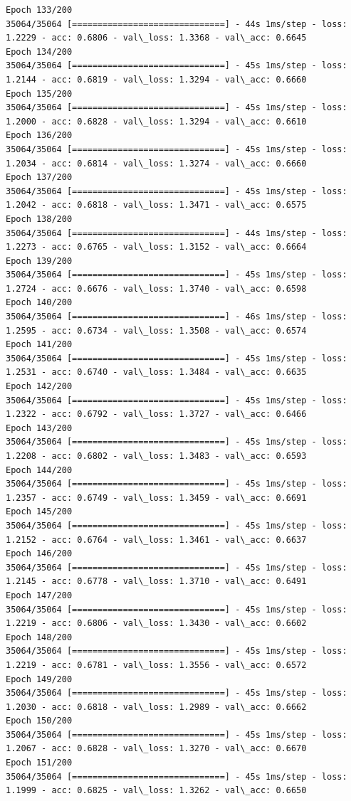 \documentclass[11pt]{article}
\begin{document}
\begin{Verbatim}[commandchars=\\\{\}]
Epoch 133/200
35064/35064 [==============================] - 44s 1ms/step - loss: 1.2229 - acc: 0.6806 - val\_loss: 1.3368 - val\_acc: 0.6645
Epoch 134/200
35064/35064 [==============================] - 45s 1ms/step - loss: 1.2144 - acc: 0.6819 - val\_loss: 1.3294 - val\_acc: 0.6660
Epoch 135/200
35064/35064 [==============================] - 45s 1ms/step - loss: 1.2000 - acc: 0.6828 - val\_loss: 1.3294 - val\_acc: 0.6610
Epoch 136/200
35064/35064 [==============================] - 45s 1ms/step - loss: 1.2034 - acc: 0.6814 - val\_loss: 1.3274 - val\_acc: 0.6660
Epoch 137/200
35064/35064 [==============================] - 45s 1ms/step - loss: 1.2042 - acc: 0.6818 - val\_loss: 1.3471 - val\_acc: 0.6575
Epoch 138/200
35064/35064 [==============================] - 44s 1ms/step - loss: 1.2273 - acc: 0.6765 - val\_loss: 1.3152 - val\_acc: 0.6664
Epoch 139/200
35064/35064 [==============================] - 45s 1ms/step - loss: 1.2724 - acc: 0.6676 - val\_loss: 1.3740 - val\_acc: 0.6598
Epoch 140/200
35064/35064 [==============================] - 46s 1ms/step - loss: 1.2595 - acc: 0.6734 - val\_loss: 1.3508 - val\_acc: 0.6574
Epoch 141/200
35064/35064 [==============================] - 45s 1ms/step - loss: 1.2531 - acc: 0.6740 - val\_loss: 1.3484 - val\_acc: 0.6635
Epoch 142/200
35064/35064 [==============================] - 45s 1ms/step - loss: 1.2322 - acc: 0.6792 - val\_loss: 1.3727 - val\_acc: 0.6466
Epoch 143/200
35064/35064 [==============================] - 45s 1ms/step - loss: 1.2208 - acc: 0.6802 - val\_loss: 1.3483 - val\_acc: 0.6593
Epoch 144/200
35064/35064 [==============================] - 45s 1ms/step - loss: 1.2357 - acc: 0.6749 - val\_loss: 1.3459 - val\_acc: 0.6691
Epoch 145/200
35064/35064 [==============================] - 45s 1ms/step - loss: 1.2152 - acc: 0.6764 - val\_loss: 1.3461 - val\_acc: 0.6637
Epoch 146/200
35064/35064 [==============================] - 45s 1ms/step - loss: 1.2145 - acc: 0.6778 - val\_loss: 1.3710 - val\_acc: 0.6491
Epoch 147/200
35064/35064 [==============================] - 45s 1ms/step - loss: 1.2219 - acc: 0.6806 - val\_loss: 1.3430 - val\_acc: 0.6602
Epoch 148/200
35064/35064 [==============================] - 45s 1ms/step - loss: 1.2219 - acc: 0.6781 - val\_loss: 1.3556 - val\_acc: 0.6572
Epoch 149/200
35064/35064 [==============================] - 45s 1ms/step - loss: 1.2030 - acc: 0.6818 - val\_loss: 1.2989 - val\_acc: 0.6662
Epoch 150/200
35064/35064 [==============================] - 45s 1ms/step - loss: 1.2067 - acc: 0.6828 - val\_loss: 1.3270 - val\_acc: 0.6670
Epoch 151/200
35064/35064 [==============================] - 45s 1ms/step - loss: 1.1999 - acc: 0.6825 - val\_loss: 1.3262 - val\_acc: 0.6650

\end{Verbatim}
\end{document}
